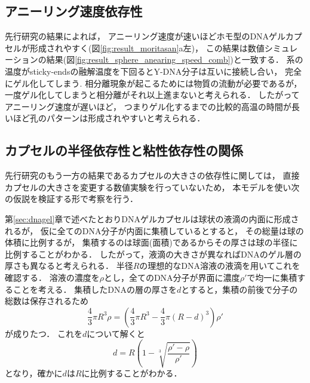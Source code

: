 \subsection{アニーリング速度依存性}
先行研究の結果によれば，
アニーリング速度が速いほどホモ型のDNAゲルカプセルが形成されやすく(図\ref{fig:result_moritasan}a左)，
この結果は数値シミュレーションの結果(図\ref{fig:result_sphere_anearing_speed_comb})と一致する．
系の温度がsticky-endsの融解温度を下回るとY-DNA分子は互いに接続し合い，
完全にゲル化してしまう\cite{sato2019sequence}.
相分離現象が起こるためには物質の流動が必要であるが，
一度ゲル化してしまうと相分離がそれ以上進まないと考えられる．
したがってアニーリング速度が遅いほど，
つまりゲル化するまでの比較的高温の時間が長いほど孔のパターンは形成されやすいと考えられる．

\subsection{カプセルの半径依存性と粘性依存性の関係}
先行研究のもう一方の結果であるカプセルの大きさの依存性に関しては，
直接カプセルの大きさを変更する数値実験を行っていないため，
本モデルを使い次の仮説を検証する形で考察を行う．

第\ref{sec:dnagel}章で述べたとおりDNAゲルカプセルは球状の液滴の内面に形成されるが，
仮に全てのDNA分子が内面に集積しているとすると，
その総量は球の体積に比例するが，
集積するのは球面(面積)であるからその厚さは球の半径に比例することがわかる．
したがって，液滴の大きさが異なればDNAのゲル層の厚さも異なると考えられる．
半径$R$の理想的なDNA溶液の液滴を用いてこれを確認する．
溶液の濃度を$\rho$とし，全てのDNA分子が界面に濃度$\rho'$で均一に集積することを考える．
集積したDNAの層の厚さを$d$とすると，集積の前後で分子の総数は保存されるため
\begin{equation}
    \frac{4}{3}\pi R^3 \rho = \left(\frac{4}{3}\pi R^3-\frac{4}{3}\pi(R-d)^3\right)\rho'
\end{equation}
が成りたつ．
これを$d$について解くと
\begin{equation}
    d = R\left(1-\sqrt[3]{\frac{\rho'-\rho}{\rho'}}\right)
\end{equation}
となり，確かに$d$は$R$に比例することがわかる．

